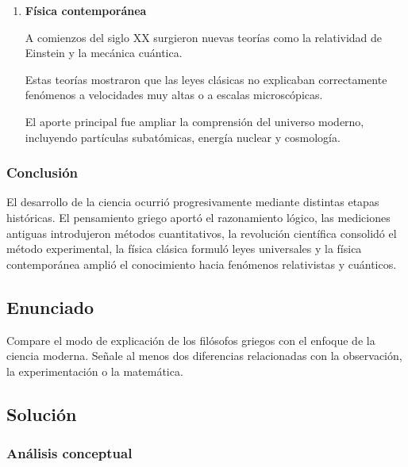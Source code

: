 \documentclass[12pt, a4paper]{article}
\begin{document}
\begin{enumerate}[label=\arabic*.]
También se desarrollaron áreas como la termodinámica y el electromagnetismo.

El aporte principal fue la formulación de leyes universales capaces de predecir fenómenos físicos con gran precisión.

\item \textbf{Física contemporánea}

A comienzos del siglo XX surgieron nuevas teorías como la relatividad de Einstein y la mecánica cuántica.

Estas teorías mostraron que las leyes clásicas no explicaban correctamente fenómenos a velocidades muy altas o a escalas microscópicas.

El aporte principal fue ampliar la comprensión del universo moderno, incluyendo partículas subatómicas, energía nuclear y cosmología.

\end{enumerate}

\subsubsection*{Conclusión}

El desarrollo de la ciencia ocurrió progresivamente mediante distintas etapas históricas. El pensamiento griego aportó el razonamiento lógico, las mediciones antiguas introdujeron métodos cuantitativos, la revolución científica consolidó el método experimental, la física clásica formuló leyes universales y la física contemporánea amplió el conocimiento hacia fenómenos relativistas y cuánticos.

\newpage

\subsection*{Enunciado}

Compare el modo de explicación de los filósofos griegos con el enfoque de la ciencia moderna. Señale al menos dos diferencias relacionadas con la observación, la experimentación o la matemática.

\subsection*{Solución}

\subsubsection*{Análisis conceptual}
\end{document}
